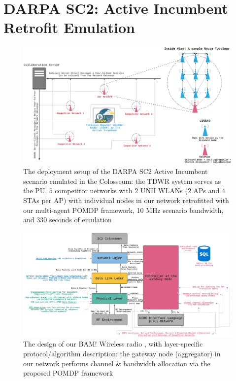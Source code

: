 \documentclass[12pt, draftcls, onecolumn]{IEEEtran}
\begin{document}
\section{DARPA SC2: Active Incumbent Retrofit Emulation}\label{Y}
\begin{figure} [htb]
    \centerline{
    \includegraphics[width = 0.8\linewidth]{figures/Minerva_Active_Incumbent_Deployment_Model_New.png}}
    \caption{The deployment setup of the DARPA SC2 Active Incumbent scenario emulated in the Colosseum: the TDWR system serves as the PU, $5$ competitor networks with $2$ UNII WLANs ($2$ APs and $4$ STAs per AP) with individual nodes in our network retrofitted with our multi-agent POMDP framework, 10 MHz scenario bandwidth, and 330 seconds of emulation \cite{DARPA:ActiveIncumbent}}
    \label{fig: Y. 0}
\end{figure}
\begin{figure} [htb]
    \centerline{
    \includegraphics[width = 0.8\linewidth]{figures/Minerva_Radio_Design_Model.png}}
    \caption{The design of our BAM! Wireless radio \cite{BAM}, with layer-specific protocol/algorithm description: the gateway node (aggregator) in our network performs channel \& bandwidth allocation via the proposed POMDP framework}
    \label{fig: Y. 1}
\end{figure}
\end{document}
